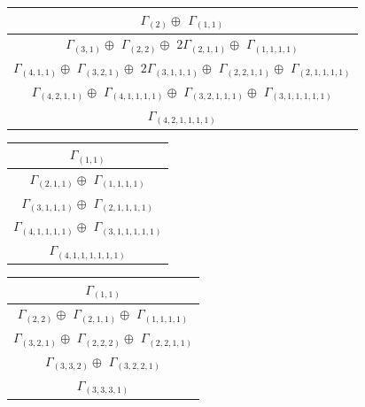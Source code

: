 \documentclass[main.tex]{subfiles}
\begin{document}
\bigskip
\begin{minipage}{.7\textwidth}
\centering
\begin{tabular}{c}
$\Gamma_{(
2
)} \oplus$
$\Gamma_{(
1 , 
1
)}$
\\ \hline
$\Gamma_{(
3 , 
1
)} \oplus$
$\Gamma_{(
2 , 
2
)} \oplus$
$2\Gamma_{(
2 , 
1 , 
1
)} \oplus$
$\Gamma_{(
1 , 
1 , 
1 , 
1
)}$
\\ \hline
$\Gamma_{(
4 , 
1 , 
1
)} \oplus$
$\Gamma_{(
3 , 
2 , 
1
)} \oplus$
$2\Gamma_{(
3 , 
1 , 
1 , 
1
)} \oplus$
$\Gamma_{(
2 , 
2 , 
1 , 
1
)} \oplus$
$\Gamma_{(
2 , 
1 , 
1 , 
1 , 
1
)}$
\\ \hline
$\Gamma_{(
4 , 
2 , 
1 , 
1
)} \oplus$
$\Gamma_{(
4 , 
1 , 
1 , 
1 , 
1
)} \oplus$
$\Gamma_{(
3 , 
2 , 
1 , 
1 , 
1
)} \oplus$
$\Gamma_{(
3 , 
1 , 
1 , 
1 , 
1 , 
1
)}$
\\ \hline
$\Gamma_{(
4 , 
2 , 
1 , 
1 , 
1 , 
1
)}$
\\
\end{tabular}\end{minipage}
\begin{minipage}{.3\textwidth}
\centering
\begin{tabular}{c}
$\Gamma_{(
1 , 
1
)}$
\\ \hline
$\Gamma_{(
2 , 
1 , 
1
)} \oplus$
$\Gamma_{(
1 , 
1 , 
1 , 
1
)}$
\\ \hline
$\Gamma_{(
3 , 
1 , 
1 , 
1
)} \oplus$
$\Gamma_{(
2 , 
1 , 
1 , 
1 , 
1
)}$
\\ \hline
$\Gamma_{(
4 , 
1 , 
1 , 
1 , 
1
)} \oplus$
$\Gamma_{(
3 , 
1 , 
1 , 
1 , 
1 , 
1
)}$
\\ \hline
$\Gamma_{(
4 , 
1 , 
1 , 
1 , 
1 , 
1 , 
1
)}$
\\
\end{tabular}\end{minipage}
\bigskip
\begin{minipage}{.5\textwidth}
\centering
\begin{tabular}{c}
$\Gamma_{(
1 , 
1
)}$
\\ \hline
$\Gamma_{(
2 , 
2
)} \oplus$
$\Gamma_{(
2 , 
1 , 
1
)} \oplus$
$\Gamma_{(
1 , 
1 , 
1 , 
1
)}$
\\ \hline
$\Gamma_{(
3 , 
2 , 
1
)} \oplus$
$\Gamma_{(
2 , 
2 , 
2
)} \oplus$
$\Gamma_{(
2 , 
2 , 
1 , 
1
)}$
\\ \hline
$\Gamma_{(
3 , 
3 , 
2
)} \oplus$
$\Gamma_{(
3 , 
2 , 
2 , 
1
)}$
\\ \hline
$\Gamma_{(
3 , 
3 , 
3 , 
1
)}$
\\
\end{tabular}\end{minipage}
\end{document}

